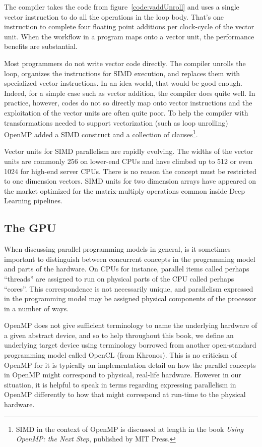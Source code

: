 The compiler takes the code from figure~\ref{code:vaddUnroll} and uses a single vector instruction 
to do all the operations in the loop body.   That's one instruction to complete four floating point additions
per clock-cycle of the vector unit.  When the workflow in a program maps onto a vector unit, the performance 
benefits are substantial.

Most programmers do not write vector code directly.  The compiler unrolls the loop, organizes the instructions for SIMD
execution, and replaces them with specialized vector instructions.  In an idea world, that would be good enough. Indeed,
for a simple case such as vector addition, the compiler does quite well.  In practice, however, codes do not so directly map
onto vector instructions and the exploitation of the vector units are often quite poor.
To help the compiler with transformations needed to support vectorization (such as loop unrolling) OpenMP added
a SIMD construct and a collection of clauses\footnote{SIMD in the context of OpenMP is discussed at length in the book
\emph{Using OpenMP: the Next Step}, published by MIT Press.}.

Vector units for SIMD parallelism are rapidly evolving.  The widths of the vector units are commonly 256 on lower-end
CPUs and have climbed up to 512 or even 1024 for high-end server CPUs.  There is no reason the concept must 
be restricted to one dimension vectors.   SIMD units for two dimension arrays have appeared on the market optimized
for the matrix-multiply operations common inside Deep Learning pipelines. 


\subsection{The GPU}

%
%
When discussing parallel programming models in general, is it sometimes important to distinguish between concurrent concepts in the programming model and parts of the hardware.
On CPUs for instance, parallel items called perhaps ``threads'' are assigned to run on physical parts of the CPU called perhaps ``cores''.
This correspondence is not necessarily unique, and parallelism expressed in the programming model may be assigned physical components of the processor in a number of ways.

OpenMP does not give sufficient terminology to name the underlying hardware of a given abstract device, and so to help throughout this book, we define an underlying target device using terminology borrowed from another open-standard programming model called OpenCL (from Khronos).
This is no criticism of OpenMP for it is typically an implementation detail on how the parallel concepts in OpenMP might correspond to physical, real-life hardware.
However in our situation, it is helpful to speak in terms regarding expressing parallelism in OpenMP differently to how that might correspond at run-time to the physical hardware.

